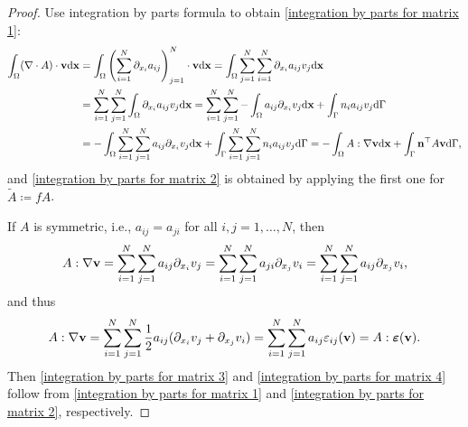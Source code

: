 \documentclass[oneside,11pt]{book}
\numberwithin{equation}{section}
\begin{document}
\begin{proof}
    Use integration by parts formula to obtain \eqref{integration by parts for matrix 1}:
    \begin{align*}
        \int_\Omega (\nabla\cdot A)\cdot{\bf v}{\rm d}{\bf x} &= \int_\Omega \left(\sum_{i=1}^N \partial_{x_i}a_{ij}\right)_{j=1}^N\cdot{\bf v}{\rm d}{\bf x} = \int_\Omega \sum_{j=1}^N\sum_{i=1}^N \partial_{x_i}a_{ij}v_j{\rm d}{\bf x}\\
        &= \sum_{i=1}^N\sum_{j=1}^N \int_\Omega \partial_{x_i}a_{ij}v_j{\rm d}{\bf x} = \sum_{i=1}^N\sum_{j=1}^N -\int_\Omega a_{ij}\partial_{x_i}v_j{\rm d}{\bf x} + \int_\Gamma n_ia_{ij}v_j{\rm d}\Gamma\\
        &= -\int_\Omega \sum_{i=1}^N\sum_{j=1}^N a_{ij}\partial_{x_i}v_j{\rm d}{\bf x} + \int_\Gamma \sum_{i=1}^N\sum_{j=1}^N n_ia_{ij}v_j{\rm d}\Gamma = -\int_\Omega A:\nabla{\bf v}{\rm d}{\bf x} + \int_\Gamma {\bf n}^\top A{\bf v}{\rm d}\Gamma,
    \end{align*}
    and \eqref{integration by parts for matrix 2} is obtained by applying the first one for $\widetilde{A}\coloneqq fA$.
    
    If $A$ is symmetric, i.e., $a_{ij} = a_{ji}$ for all $i,j = 1,\ldots,N$, then
    \begin{align*}
        A:\nabla{\bf v} = \sum_{i=1}^N\sum_{j=1}^N a_{ij}\partial_{x_i}v_j = \sum_{i=1}^N\sum_{j=1}^N a_{ji}\partial_{x_j}v_i = \sum_{i=1}^N\sum_{j=1}^N a_{ij}\partial_{x_j}v_i,
    \end{align*}
    and thus
    \begin{align*}
        A:\nabla{\bf v} = \sum_{i=1}^N\sum_{j=1}^N \frac{1}{2}a_{ij}(\partial_{x_i}v_j + \partial_{x_j}v_i) = \sum_{i=1}^N\sum_{j=1}^N a_{ij}\varepsilon_{ij}({\bf v}) = A:\boldsymbol{\varepsilon}({\bf v}).
    \end{align*}
    Then \eqref{integration by parts for matrix 3} and \eqref{integration by parts for matrix 4} follow from \eqref{integration by parts for matrix 1} and \eqref{integration by parts for matrix 2}, respectively.
\end{proof}
\end{document}
